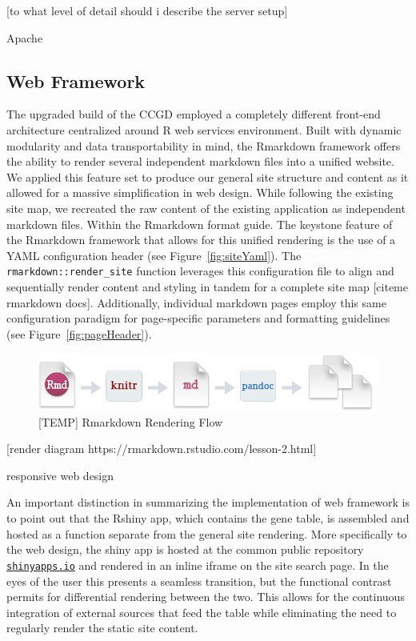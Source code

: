 \documentclass[10pt]{report}
\begin{document}
[to what level of detail should i describe the server setup]

Apache

\subsection{Web Framework}
The upgraded build of the CCGD employed a completely different front-end architecture centralized around R web services environment. Built with dynamic modularity and data transportability in mind, the Rmarkdown framework offers the ability to render several independent markdown files into a unified website. We applied this feature set to produce our general site structure and content as it allowed for a massive simplification in web design. While following the existing site map, we recreated the raw content of the existing application as independent markdown files. Within the Rmarkdown format guide. The keystone feature of the Rmarkdown framework that allows for this unified rendering is the use of a YAML configuration header (see Figure~\ref{fig:siteYaml}). The \texttt{rmarkdown::render\_site} function leverages this configuration file to align and sequentially render content and styling in tandem for a complete site map [citeme rmarkdown docs]. Additionally, individual markdown pages employ this same configuration paradigm for page-specific parameters and formatting guidelines (see Figure~\ref{fig:pageHeader}).

\begin{figure}[H]
    \includegraphics[width=\linewidth]{figs/rmarkdownflow.png}
    \caption{[TEMP] Rmarkdown Rendering Flow}\label{fig:renderFlow}
\end{figure}

[render diagram https://rmarkdown.rstudio.com/lesson-2.html]

responsive web design

An important distinction in summarizing the implementation of web framework is to point out that the Rshiny app, which contains the gene table, is assembled and hosted as a function separate from the general site rendering. More specifically to the web design, the shiny app is hosted at the common public repository \href{https://ctastad.shinyapps.io/table_app/}{\texttt{shinyapps.io}} and rendered in an inline iframe on the site search page. In the eyes of the user this presents a seamless transition, but the functional contrast permits for differential rendering between the two. This allows for the continuous integration of external sources that feed the table while eliminating the need to regularly render the static site content.
\end{document}
